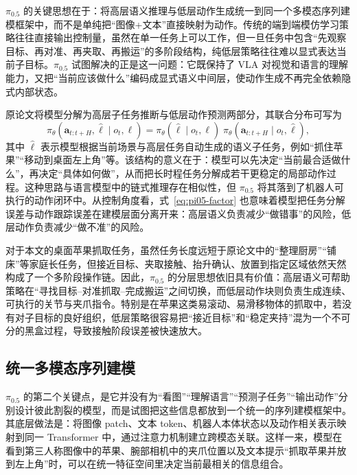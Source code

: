 $\pi_{0.5}$ 的关键思想在于：将高层语义推理与低层动作生成统一到同一个多模态序列建模框架中，而不是单纯把“图像+文本”直接映射为动作。传统的端到端模仿学习策略往往直接输出控制量，虽然在单一任务上可以工作，但一旦任务中包含“先观察目标、再对准、再夹取、再搬运”的多阶段结构，纯低层策略往往难以显式表达当前子目标。$\pi_{0.5}$ 试图解决的正是这一问题：它既保持了 VLA 对视觉和语言的理解能力，又把“当前应该做什么”编码成显式语义中间层，使动作生成不再完全依赖隐式内部状态。

原论文将模型分解为高层子任务推断与低层动作预测两部分，其联合分布可写为
\begin{equation}
  \pi_{\theta}(\mathbf{a}_{t:t+H},\hat{\ell}\mid o_t,\ell)
  =
  \pi_{\theta}(\hat{\ell}\mid o_t,\ell)\;
  \pi_{\theta}(\mathbf{a}_{t:t+H}\mid o_t,\hat{\ell}),
  \label{eq:pi05-factor}
\end{equation}
其中 $\hat{\ell}$ 表示模型根据当前场景与高层任务自动生成的语义子任务，例如“抓住苹果”“移动到桌面左上角”等。该结构的意义在于：模型可以先决定“当前最合适做什么”，再决定“具体如何做”，从而把长时程任务分解成若干更稳定的局部动作过程。这种思路与语言模型中的链式推理存在相似性，但 $\pi_{0.5}$ 将其落到了机器人可执行的动作闭环中\cite{black2025pi05}。从控制角度看，式~\eqref{eq:pi05-factor} 也意味着模型把任务分解误差与动作跟踪误差在建模层面分离开来：高层语义负责减少“做错事”的风险，低层动作负责减少“做不准”的风险。

对于本文的桌面苹果抓取任务，虽然任务长度远短于原论文中的“整理厨房”“铺床”等家庭长任务，但接近目标、夹取接触、抬升确认、放置到指定区域依然天然构成了一个多阶段操作链。因此，$\pi_{0.5}$ 的分层思想依旧具有价值：高层语义可帮助策略在“寻找目标--对准抓取--完成搬运”之间切换，而低层动作块则负责生成连续、可执行的关节与夹爪指令。特别是在苹果这类易滚动、易滑移物体的抓取中，若没有对子目标的良好组织，低层策略很容易把“接近目标”和“稳定夹持”混为一个不可分的黑盒过程，导致接触阶段误差被快速放大。

\subsection{统一多模态序列建模}

$\pi_{0.5}$ 的第二个关键点，是它并没有为“看图”“理解语言”“预测子任务”“输出动作”分别设计彼此割裂的模型，而是试图把这些信息都放到一个统一的序列建模框架中。其底层做法是：将图像 patch、文本 token、机器人本体状态以及动作相关表示映射到同一 Transformer 中，通过注意力机制建立跨模态关联。这样一来，模型在看到第三人称图像中的苹果、腕部相机中的夹爪位置以及文本提示“抓取苹果并放到左上角”时，可以在统一特征空间里决定当前最相关的信息组合。

